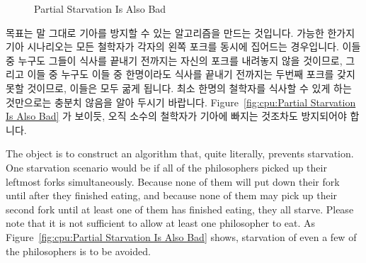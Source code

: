 \begin{figure}[tb]
\centering
{}
\caption{Partial Starvation Is Also Bad}
\end{figure}

목표는 말 그대로 기아를 방지할 수 있는 알고리즘을 만드는 것입니다.
가능한 한가지 기아 시나리오는 모든 철학자가 각자의 왼쪽 포크를 동시에 집어드는
경우입니다.
이들 중 누구도 그들이 식사를 끝내기 전까지는 자신의 포크를 내려놓지 않을
것이므로, 그리고 이들 중 누구도 이들 중 한명이라도 식사를 끝내기 전까지는
두번째 포크를 갖지 못할 것이므로, 이들은 모두 굶게 됩니다.
최소 한명의 철학자를 식사할 수 있게 하는 것만으로는 충분치 않음을 알아 두시기
바랍니다.
Figure~\ref{fig:cpu:Partial Starvation Is Also Bad} 가 보이듯, 오직 소수의
철학자가 기아에 빠지는 것조차도 방지되어야 합니다.

\iffalse

The object is to construct an algorithm that, quite literally,
prevents starvation.
One starvation scenario would be if all of the philosophers picked up
their leftmost forks simultaneously.
Because none of them will put down their fork until after they finished
eating, and because none of them may pick up their second fork until at
least one of them has finished eating, they all starve.
Please note that it is not sufficient to allow at least one philosopher
to eat.
As Figure~\ref{fig:cpu:Partial Starvation Is Also Bad}
shows, starvation of even a few of the philosophers is to be avoided.

